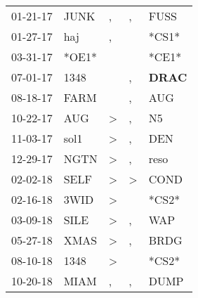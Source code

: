 \begin{supertabular}{p{0.07\textwidth}p{0.06\textwidth}p{0.02\textwidth}p{0.02\textwidth}p{0.06\textwidth}}
          01-21-17\textsuperscript{} &           JUNK\textsuperscript{} &                , &                , &           FUSS\textsuperscript{} \\
          01-27-17\textsuperscript{} &            haj\textsuperscript{} &                , &                  &                            *CS1* \\
          03-31-17\textsuperscript{} &                            *OE1* &                  &                  &                            *CE1* \\
          07-01-17\textsuperscript{} &           1348\textsuperscript{} &                  &                , &  \textbf{DRAC\textsuperscript{}} \\
          08-18-17\textsuperscript{} &           FARM\textsuperscript{} &                  &                , &            AUG\textsuperscript{} \\
          10-22-17\textsuperscript{} &            AUG\textsuperscript{} &     \textgreater &                , &             N5\textsuperscript{} \\
          11-03-17\textsuperscript{} &           sol1\textsuperscript{} &     \textgreater &                , &            DEN\textsuperscript{} \\
          12-29-17\textsuperscript{} &           NGTN\textsuperscript{} &     \textgreater &                , &           reso\textsuperscript{} \\
          02-02-18\textsuperscript{} &           SELF\textsuperscript{} &     \textgreater &     \textgreater &           COND\textsuperscript{} \\
          02-16-18\textsuperscript{} &           3WID\textsuperscript{} &     \textgreater &                  &                            *CS2* \\
          03-09-18\textsuperscript{} &           SILE\textsuperscript{} &     \textgreater &                , &            WAP\textsuperscript{} \\
          05-27-18\textsuperscript{} &           XMAS\textsuperscript{} &     \textgreater &                , &           BRDG\textsuperscript{} \\
          08-10-18\textsuperscript{} &           1348\textsuperscript{} &     \textgreater &                  &                            *CS2* \\
          10-20-18\textsuperscript{} &           MIAM\textsuperscript{} &                , &                , &           DUMP\textsuperscript{} \\

\end{supertabular}

